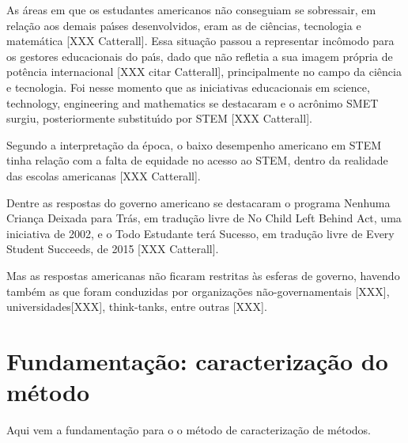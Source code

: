 \documentclass[
12pt,		%
openright,	%
twoside,  %
a4paper,			%
chapter=TITLE,		%
english,			%
french,				%
spanish,			%
brazil				%
]{USPSC-classe/USPSC_RedarTex}
\begin{document}
As \'areas em que os estudantes americanos n\~ao conseguiam se sobressair, em rela\c{c}\~ao aos demais pa\'{\i}ses desenvolvidos, eram as de ci\^encias, tecnologia e matem\'atica [XXX Catterall]. Essa situa\c{c}\~ao passou a representar inc\^omodo para os gestores educacionais do pa\'{\i}s, dado que n\~ao refletia a sua imagem pr\'opria de pot\^encia internacional [XXX citar Catterall], principalmente no campo da ci\^encia e tecnologia. Foi nesse momento que as iniciativas educacionais em \textquotedbl science, technology, engineering and mathematics se destacaram e o acr\^onimo SMET surgiu, posteriormente substitu\'{\i}do por STEM [XXX  Catterall].








Segundo a interpreta\c{c}\~ao da \'epoca, o baixo desempenho americano em STEM tinha rela\c{c}\~ao com a falta de equidade no acesso ao STEM, dentro da realidade das escolas americanas [XXX Catterall].








Dentre as respostas do governo americano se destacaram o programa \textquotedbl Nenhuma Crian\c{c}a Deixada para Tr\'as, em tradu\c{c}\~ao livre de \textquotedbl No Child Left Behind Act, uma iniciativa de 2002, e o \textquotedbl Todo Estudante ter\'a Sucesso, em tradu\c{c}\~ao livre de \textquotedbl Every Student Succeeds, de 2015 [XXX Catterall].








Mas as respostas americanas n\~ao ficaram restritas \`as esferas de governo, havendo tamb\'em as que foram conduzidas por organiza\c{c}\~oes n\~ao-governamentais [XXX], universidades[XXX], think-tanks, entre outras [XXX].








\section[Fundamenta\c{c}\~ao: caracteriza\c{c}\~ao do m\'etodo]{Fundamenta\c{c}\~ao: caracteriza\c{c}\~ao do m\'etodo}\label{Fundamenta\c{c}\~ao: caracteriza\c{c}\~ao do m\'etodo}
Aqui vem a fundamenta\c{c}\~ao para o o m\'etodo de caracteriza\c{c}\~ao de m\'etodos.
\end{document}
